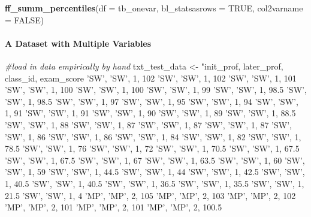 \documentclass[
]{book}
\newenvironment{Shaded}{\begin{snugshade}}{\end{snugshade}}
\newcommand{\CommentTok}[1]{\textcolor[rgb]{0.56,0.35,0.01}{\textit{#1}}}
\newcommand{\DataTypeTok}[1]{\textcolor[rgb]{0.13,0.29,0.53}{#1}}
\newcommand{\KeywordTok}[1]{\textcolor[rgb]{0.13,0.29,0.53}{\textbf{#1}}}
\newcommand{\NormalTok}[1]{#1}
\newcommand{\OtherTok}[1]{\textcolor[rgb]{0.56,0.35,0.01}{#1}}
\newcommand{\StringTok}[1]{\textcolor[rgb]{0.31,0.60,0.02}{#1}}
\begin{document}
\begin{Shaded}
\begin{Highlighting}[]
\KeywordTok{ff_summ_percentiles}\NormalTok{(}\DataTypeTok{df =}\NormalTok{ tb_onevar, }\DataTypeTok{bl_statsasrows =} \OtherTok{TRUE}\NormalTok{, }\DataTypeTok{col2varname =} \OtherTok{FALSE}\NormalTok{)}
\end{Highlighting}
\end{Shaded}

\hypertarget{a-dataset-with-multiple-variables}{%
\paragraph{A Dataset with Multiple Variables}\label{a-dataset-with-multiple-variables}}

\begin{Shaded}
\begin{Highlighting}[]
\CommentTok{#load in data empirically by hand}
\NormalTok{txt_test_data <-}\StringTok{ "init_prof, later_prof, class_id, exam_score}
\StringTok{ 'SW', 'SW', 1, 102}
\StringTok{ 'SW', 'SW', 1, 102}
\StringTok{ 'SW', 'SW', 1, 101}
\StringTok{ 'SW', 'SW', 1, 100}
\StringTok{ 'SW', 'SW', 1, 100}
\StringTok{ 'SW', 'SW', 1, 99}
\StringTok{ 'SW', 'SW', 1, 98.5}
\StringTok{ 'SW', 'SW', 1, 98.5}
\StringTok{ 'SW', 'SW', 1, 97}
\StringTok{ 'SW', 'SW', 1, 95}
\StringTok{ 'SW', 'SW', 1, 94}
\StringTok{ 'SW', 'SW', 1, 91}
\StringTok{ 'SW', 'SW', 1, 91}
\StringTok{ 'SW', 'SW', 1, 90}
\StringTok{ 'SW', 'SW', 1, 89}
\StringTok{ 'SW', 'SW', 1, 88.5}
\StringTok{ 'SW', 'SW', 1, 88}
\StringTok{ 'SW', 'SW', 1, 87}
\StringTok{ 'SW', 'SW', 1, 87}
\StringTok{ 'SW', 'SW', 1, 87}
\StringTok{ 'SW', 'SW', 1, 86}
\StringTok{ 'SW', 'SW', 1, 86}
\StringTok{ 'SW', 'SW', 1, 84}
\StringTok{ 'SW', 'SW', 1, 82}
\StringTok{ 'SW', 'SW', 1, 78.5}
\StringTok{ 'SW', 'SW', 1, 76}
\StringTok{ 'SW', 'SW', 1, 72}
\StringTok{ 'SW', 'SW', 1, 70.5}
\StringTok{ 'SW', 'SW', 1, 67.5}
\StringTok{ 'SW', 'SW', 1, 67.5}
\StringTok{ 'SW', 'SW', 1, 67}
\StringTok{ 'SW', 'SW', 1, 63.5}
\StringTok{ 'SW', 'SW', 1, 60}
\StringTok{ 'SW', 'SW', 1, 59}
\StringTok{ 'SW', 'SW', 1, 44.5}
\StringTok{ 'SW', 'SW', 1, 44}
\StringTok{ 'SW', 'SW', 1, 42.5}
\StringTok{ 'SW', 'SW', 1, 40.5}
\StringTok{ 'SW', 'SW', 1, 40.5}
\StringTok{ 'SW', 'SW', 1, 36.5}
\StringTok{ 'SW', 'SW', 1, 35.5}
\StringTok{ 'SW', 'SW', 1, 21.5}
\StringTok{ 'SW', 'SW', 1, 4}
\StringTok{ 'MP', 'MP', 2, 105}
\StringTok{ 'MP', 'MP', 2, 103}
\StringTok{ 'MP', 'MP', 2, 102}
\StringTok{ 'MP', 'MP', 2, 101}
\StringTok{ 'MP', 'MP', 2, 101}
\StringTok{ 'MP', 'MP', 2, 100.5}

\end{Highlighting}
\end{Shaded}
\end{document}
